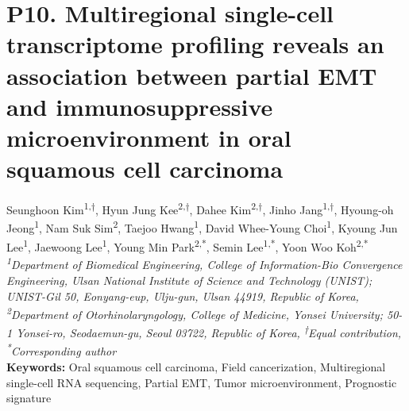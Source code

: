 
\section*{P10. Multiregional single-cell transcriptome profiling reveals an association between partial EMT and immunosuppressive microenvironment in oral squamous cell carcinoma}

\begin{center}
Seunghoon Kim\href{https://orcid.org/0000-0002-2475-9551}{\textcolor{orcidlogocol}{\aiOrcid}}\textsuperscript{1,†}, Hyun Jung Kee\textsuperscript{2,†}, Dahee Kim\textsuperscript{2,†}, Jinho Jang\textsuperscript{1,†}, Hyoung-oh Jeong\textsuperscript{1}, Nam Suk Sim\textsuperscript{2}, Taejoo Hwang\textsuperscript{1}, David Whee-Young Choi\textsuperscript{1}, Kyoung Jun Lee\textsuperscript{1}, Jaewoong Lee\textsuperscript{1}, Young Min Park\textsuperscript{2,*}, Semin Lee\textsuperscript{1,*}, Yoon Woo Koh\textsuperscript{2,*} \\
\vspace{0.2cm}
\textit{\textsuperscript{1}Department of Biomedical Engineering, College of Information-Bio Convergence Engineering, Ulsan National Institute of Science and Technology (UNIST); UNIST-Gil 50, Eonyang-eup, Ulju-gun, Ulsan 44919, Republic of Korea, \textsuperscript{2}Department of Otorhinolaryngology, College of Medicine, Yonsei University; 50-1 Yonsei-ro, Seodaemun-gu, Seoul 03722, Republic of Korea, \textsuperscript{†}Equal contribution, \textsuperscript{*}Corresponding author} \\
\vspace{0.2cm}
\textbf{Keywords:} Oral squamous cell carcinoma, Field cancerization, Multiregional single-cell RNA sequencing, Partial EMT, Tumor microenvironment, Prognostic signature
\end{center}

